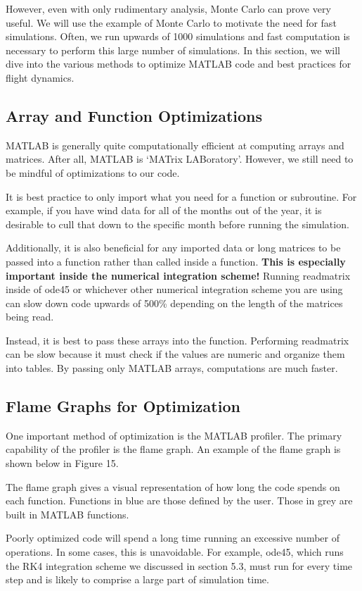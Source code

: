 \documentclass[12pt]{report}
\begin{document}
However, even with only rudimentary analysis, Monte Carlo can prove very useful. We will use the example of Monte Carlo to motivate the need for fast simulations. Often, we run upwards of 1000 simulations and fast computation is necessary to perform this large number of simulations. In this section, we will dive into the various methods to optimize MATLAB code and best practices for flight dynamics.
\subsection{Array and Function Optimizations}
MATLAB is generally quite computationally efficient at computing arrays and matrices. After all, MATLAB is ‘MATrix LABoratory’. However, we still need to be mindful of optimizations to our code.

It is best practice to only import what you need for a function or subroutine. For example, if you have wind data for all of the months out of the year, it is desirable to cull that down to the specific month before running the simulation.

Additionally, it is also beneficial for any imported data or long matrices to be passed into a function rather than called inside a function. \textbf{This is especially important inside the numerical integration scheme! }Running readmatrix inside of ode45 or whichever other numerical integration scheme you are using can slow down code upwards of 500\% depending on the length of the matrices being read.

Instead, it is best to pass these arrays into the function. Performing readmatrix can be slow because it must check if the values are numeric and organize them into tables. By passing only MATLAB arrays, computations are much faster.
\subsection{Flame Graphs for Optimization}
One important method of optimization is the MATLAB profiler. The primary capability of the profiler is the flame graph. An example of the flame graph is shown below in Figure 15.

The flame graph gives a visual representation of how long the code spends on each function. Functions in blue are those defined by the user. Those in grey are built in MATLAB functions.

Poorly optimized code will spend a long time running an excessive number of operations. In some cases, this is unavoidable. For example, ode45, which runs the RK4 integration scheme we discussed in section 5.3, must run for every time step and is likely to comprise a large part of simulation time.
\end{document}
